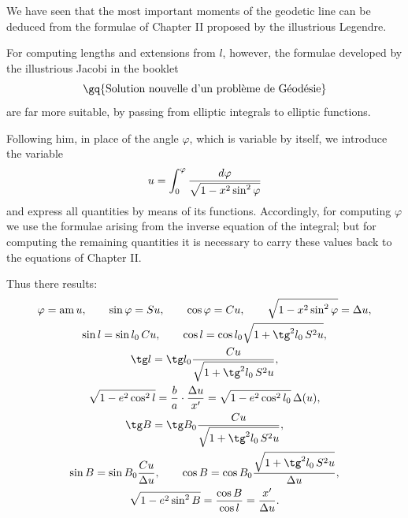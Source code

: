 \begingroup\small
{}

We have seen that the most important moments of the geodetic line can be deduced from the formulae of Chapter II proposed by the illustrious Legendre.

For computing lengths and extensions from $l$, however, the formulae developed by the illustrious Jacobi in the booklet
\[
\text{\gq{Solution nouvelle d'un problème de Géodésie}}
\]
are far more suitable, by passing from elliptic integrals to elliptic functions.


Following him, in place of the angle $\varphi$, which is variable by itself, we introduce the variable
\[
 u=\int_0^\varphi {d\varphi\over \sqrt{1-x^2\sin^2\varphi}}
\]
and express all quantities by means of its functions. Accordingly, for computing $\varphi$ we use the formulae arising from the inverse equation of the integral; but for computing the remaining quantities it is necessary to carry these values back to the equations of Chapter II.

Thus there results:
\[
\begin{gathered}
 \varphi=\operatorname{am}u,\qquad \sin\varphi=Su,
 \qquad \cos\varphi=Cu,\qquad \sqrt{1-x^2\sin^2\varphi}=\Delta u,\\
 \sin l=\sin l_0\,Cu,\qquad
 \cos l=\cos l_0\sqrt{1+\tg^2 l_0\,S^2u},\\
 \tg l=\tg l_0{Cu\over \sqrt{1+\tg^2l_0\,S^2u}},\\
 \sqrt{1-e^2\cos^2l}={b\over a}\cdot {\Delta u\over x'}
 =\sqrt{1-e^2\cos^2l_0}\,\Delta(u),\\
 \tg B=\tg B_0{Cu\over \sqrt{1+\tg^2l_0\,S^2u}},\\
 \sin B=\sin B_0{Cu\over \Delta u},
 \qquad
 \cos B=\cos B_0{\sqrt{1+\tg^2l_0\,S^2u}\over \Delta u},\\
 \sqrt{1-e^2\sin^2B}={\cos B\over \cos l}={x'\over \Delta u}.
\end{gathered}
\]
\endgroup

